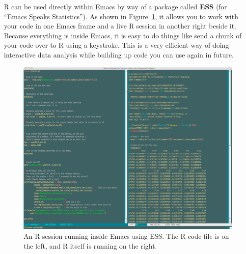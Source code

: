 \documentclass[11pt,article,oneside]{memoir}
\begin{document}
R can be used directly within Emacs by way of a package called \textbf{ESS}
(for ``Emacs Speaks Statistics''). As shown in Figure~\ref{fig:ess}, it allows you to work with your code in one Emacs frame and a live R session in another right beside it. Because everything is inside Emacs, it is easy to do things like send a chunk of your code over to R using a keystroke. This is a very efficient way of doing interactive data analysis while building up code you can use again in future.  

\begin{figure}[h]
	\centering
		\includegraphics[scale=0.25]{figures/EmacsESS2}
	\caption{An R session running inside Emacs using ESS. The R code file is on the left, and R itself is running on the right.}
	\label{fig:ess}
\end{figure}
                           
\end{document}
